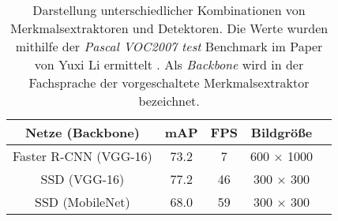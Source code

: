 \begin{table}[H]
	\caption{Darstellung unterschiedlicher Kombinationen von Merkmalsextraktoren und Detektoren. Die Werte wurden mithilfe der \textit{Pascal VOC2007 test} Benchmark im Paper von Yuxi Li ermittelt \cite{leightweight}. Als \textit{Backbone} wird in der Fachsprache der vorgeschaltete Merkmalsextraktor bezeichnet.  }
	\begin{center}
		\begin{tabular}{|c|c|c|c|c|}
			\hline
			\multicolumn{1}{|c|}{Netze (Backbone)} & \multicolumn{1}{c|}{mAP} & \multicolumn{1}{c|}{FPS} & \multicolumn{1}{c|}{Bildgröße} \\ \hline
			Faster R-CNN (VGG-16)	&73.2 	&7 		& 600 $\times$ 1000 	 \\
			SSD (VGG-16)			&77.2 	&46		& 	300 $\times$ 300  	 \\
			SSD (MobileNet)			&68.0	&59		& 300 $\times$ 300 \\
			
			\hline
		\end{tabular}
	\end{center}

	\label{fig: mobilessdtab}
\end{table}